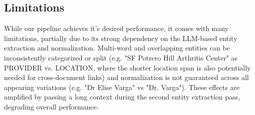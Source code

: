 





 
\subsection{Limitations}
While our pipeline achieves it's desired performance, it comes with many limitations, partially due to its strong dependency on the LLM-based entity extraction and normalization. Multi-word and overlapping entities can be inconsistently categorized or split (e.g. "SF Potrero Hill Arthritis Center" as PROVIDER vs. LOCATION, where the shorter location span is also potentially needed for cross-document links) and normalization is not guaranteed across all appearing variations (e.g. "Dr Elise Varga" vs "Dr. Varga"). These effects are amplified by passing a long context during the second entity extraction pass, degrading overall performance.

